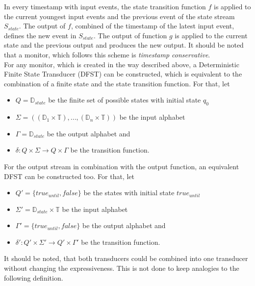 		In every timestamp with input events, the state transition function $f$ is applied to the current youngest input events and the previous event of the state stream $S_{state}$. The output of $f$, combined of the timestamp of the latest input event, defines the new event in $S_{state}$. The output of function $g$ is applied to the current state and the previous output and produces the new output. It should be noted that a monitor, which follows this scheme is \textit{timestamp conservative}.\\
		For any monitor, which is created in the way described above, a Deterministic Finite State Transducer (DFST) can be constructed, which is equivalent to the combination of a finite state and the state transition function. For that, let
		\begin{itemize}
			\item
			$Q=\mathbb{D}_{state}$ be the finite set of possible states with initial state $q_0$
			\item
			$\Sigma=((\mathbb{D}_1\times \mathbb{T}),...,(\mathbb{D}_n\times \mathbb{T}))$ be the input alphabet
			\item
			$\Gamma = \mathbb D_{state}$ be the output alphabet and
			\item
			$\delta: Q\times \Sigma\rightarrow Q\times\Gamma$ be the transition function.
		\end{itemize}
		For the output stream in combination with the output function, an equivalent DFST can be constructed too. For that, let
		\begin{itemize}
			\item
				$Q' = \{true_{until}, false\}$ be the states with initial state $true_{until}$
			\item
				$\Sigma'=\mathbb D_{state}\times \mathbb{T}$ be the input alphabet
			\item
				$\Gamma' = \{true_{until}, false\}$ be the output alphabet and
			\item
				$\delta': Q'\times \Sigma'\rightarrow Q'\times\Gamma'$ be the transition function.
		\end{itemize}
		It should be noted, that both transducers could be combined into one transducer without changing the expressiveness. This is not done to keep analogies to the following definition.
